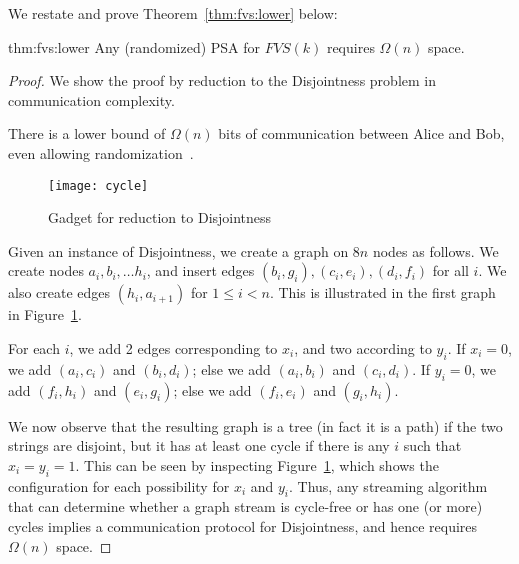 \documentclass[11pt,letter]{article}
\begin{document}
We restate and prove Theorem~\ref{thm:fvs:lower} below:

\begin{reptheorem}{thm:fvs:lower}
Any (randomized) PSA for $FVS(k)$ requires $\Omega(n)$ space.
\end{reptheorem}


\begin{proof}
We show the proof by reduction to the {\textsc Disjointness} problem
in communication complexity.

\begin{center}
\noindent{}
\end{center}

There is a lower bound of $\Omega(n)$ bits of communication between
Alice and Bob, even allowing randomization~\cite{nisan}.

\begin{figure}[t]
\centering
\texttt{[image: cycle]}
\caption{Gadget for reduction to {\textsc Disjointness}}
\label{fig:disj}
\end{figure}

Given an instance of {\textsc Disjointness}, we create a graph on $8n$
nodes as follows.
We create nodes $a_i, b_i, \ldots h_i$, and insert edges
$(b_i, g_i), (c_i, e_i), (d_i, f_i)$ for all $i$.
We also create edges $(h_i, a_{i+1})$ for $1 \leq i < n$.
This is illustrated in the first graph in Figure~\ref{fig:disj}.

For each $i$, we add 2 edges corresponding to $x_i$, and two according
to $y_i$.
If $x_i = 0$, we add $(a_i, c_i)$ and $(b_i, d_i)$; else we add $(a_i,
b_i)$ and $(c_i, d_i)$.
If $y_i=0$, we add $(f_i, h_i)$ and $(e_i, g_i)$; else we add $(f_i,
e_i)$ and $(g_i, h_i)$.

We now observe that the resulting graph is a tree (in fact it is a
path) if the two strings are disjoint, but it has at least one cycle
if there is any $i$ such that $x_i =  y_i = 1$.
This can be seen by inspecting Figure~\ref{fig:disj}, which shows the
configuration for each possibility for $x_i$ and $y_i$.
Thus, any streaming algorithm that can determine whether a graph
stream is cycle-free or has one (or more) cycles implies a
communication protocol for {\sc Disjointness}, and hence requires
$\Omega(n)$ space.


\end{proof}
\end{document}
